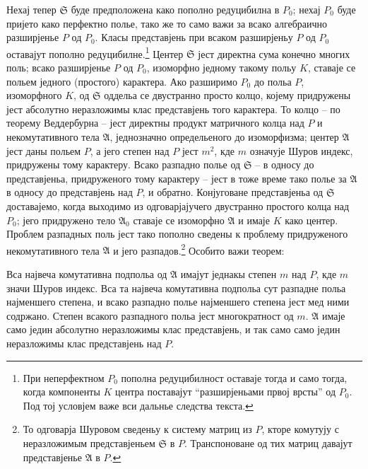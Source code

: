 ﻿\documentclass[11pt]{article}
\newcommand{\mS}{\mathfrak{S}}
\newcommand{\mA}{\mathfrak{A}}
\begin{document}
\noindent Нехај тепер $\mS$ буде предположена како пополно редуцибилна в $P_0$; нехај $P_0$ буде пријето како перфектно полье, тако же то само важи за всако алгебраично разширјенье $P$ од $P_0$. Класы представјень при всаком разширјеньу $P$ од $P_0$ оставајут пополно редуцибилне.\footnote{При неперфектном $P_0$ пополна редуцибилност оставаје тогда и само тогда, когда компоненты $K$ центра поставајут “разширјеньами првој врсты” од $P_0$. Под тој условјем важе вси дальнье следства текста.} Центер $\mS$ јест директна сума конечно многих поль; всако разширјенье $P$ од $P_0$, изоморфно једному такому польу $K$, ставаје се польем једного (простого) карактера. Ако разширимо $P_0$ до польа $P$, изоморфного $K$, од $\mS$ оддельа се двустранно просто колцо, којему придружены јест абсолутно неразложимы клас представјень того карактера. То колцо -- по теорему Веддербурна -- јест директны продукт матричного колца над $P$ и некомутативного тела $\mA$, једнозначно определьеного до изоморфизма; центер $\mA$ јест даны польем $P$, а јего степен над $P$ јест $m^2$, кде $m$ означује Шуров индекс, придружены тому карактеру. Всако разпадно полье од $\mS$ -- в односу до представјеньа, придруженого тому карактеру -- јест в тоже време тако полье за $\mA$ в односу до представјень над $P$, и обратно. Конјуговане представјеньа од $\mS$ доставајемо, когда выходимо из одговарјајучего двустранно простого колца над $P_0$; јего придружено тело $\mA_0$ ставаје се изоморфно $\mA$ и имаје $K$ како центер. Проблем разпадных поль јест тако пополно сведены к проблему придруженого некомутативного тела $\mA$ и јего разпадов.\footnote{То одговарја Шуровом сведеньу к систему матриц из $P$, кторе комутују с неразложимым представјеньем $\mS$ в $P$. Транспоноване од тих матриц давајут представјенье $\mA$ в $P$.} Особито важи теорем:

\medskip

\noindent Вса највеча комутативна подпольа од $\mA$ имајут једнакы степен $m$ над $P$, кде $m$ значи Шуров индекс. Вса та највеча комутативна подпольа сут разпадне польа најменшего степена, и всако разпадно полье најменшего степена јест мед ними содржано. Степен всакого разпадного польа јест многократност од $m$. $\mA$ имаје само једин абсолутно неразложимы клас представјень, и так само само једин неразложимы клас представјень над $P$.
\end{document}
